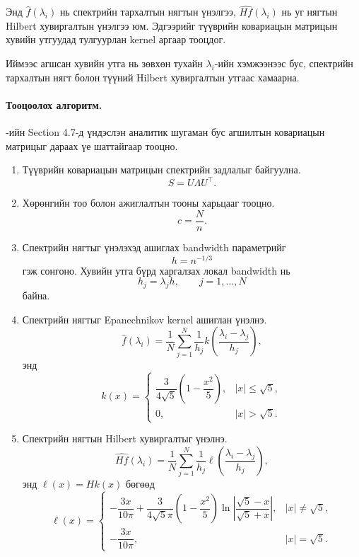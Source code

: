 Энд $\widehat{f}(\lambda_i)$ нь
спектрийн тархалтын нягтын үнэлгээ,
$\widehat{Hf}(\lambda_i)$ нь уг нягтын
Hilbert хувиргалтын үнэлгээ юм.
Эдгээрийг түүврийн ковариацын матрицын
хувийн утгуудад тулгуурлан kernel
аргаар тооцдог.

Иймээс агшсан хувийн утга нь зөвхөн
тухайн $\lambda_i$-ийн хэмжээнээс бус,
спектрийн тархалтын нягт болон түүний
Hilbert хувиргалтын утгаас хамаарна.

\paragraph{Тооцоолох алгоритм.}

\citet{ledoitwolf2020}-ийн Section 4.7-д
үндэслэн аналитик шугаман бус агшилтын
ковариацын матрицыг дараах үе шаттайгаар
тооцно.

\begin{enumerate}
	

	\item Түүврийн ковариацын матрицын
	спектрийн задлалыг байгуулна.
	\[
	S=U\Lambda U^{\top}.
	\]
	
	\item Хөрөнгийн тоо болон ажиглалтын
	тооны харьцааг тооцно.
	\[
	c=\frac{N}{n}.
	\]
	
	\item Спектрийн нягтыг үнэлэхэд
	ашиглах bandwidth параметрийг
	\[
	h=n^{-1/3}
	\]
	гэж сонгоно. Хувийн утга бүрд
	харгалзах локал bandwidth нь
	\[
	h_j=\lambda_jh,
	\qquad j=1,\ldots,N
	\]
	байна.
	
	\item Спектрийн нягтыг Epanechnikov
	kernel ашиглан үнэлнэ.
	\[
	\widehat{f}(\lambda_i)
	=
	\frac{1}{N}
	\sum_{j=1}^{N}
	\frac{1}{h_j}
	k\left(
	\frac{\lambda_i-\lambda_j}{h_j}
	\right),
	\]
	энд
	\[
	k(x)
	=
	\begin{cases}
		\dfrac{3}{4\sqrt{5}}
		\left(1-\dfrac{x^2}{5}\right),
		& |x|\leq\sqrt{5},\\[0.5em]
		0,
		& |x|>\sqrt{5}.
	\end{cases}
	\]
	
	\item Спектрийн нягтын Hilbert
	хувиргалтыг үнэлнэ.
	\[
	\widehat{Hf}(\lambda_i)
	=
	\frac{1}{N}
	\sum_{j=1}^{N}
	\frac{1}{h_j}
	\ell\left(
	\frac{\lambda_i-\lambda_j}{h_j}
	\right),
	\]
	энд $\ell(x)=Hk(x)$ бөгөөд
	\[
	\ell(x)
	=
	\begin{cases}
		-\dfrac{3x}{10\pi}
		+
		\dfrac{3}{4\sqrt{5}\pi}
		\left(1-\dfrac{x^2}{5}\right)
		\ln\left|
		\dfrac{\sqrt{5}-x}{\sqrt{5}+x}
		\right|,
		& |x|\neq\sqrt{5},\\[1em]
		-\dfrac{3x}{10\pi},
		& |x|=\sqrt{5}.
	\end{cases}
	\]
	

\end{enumerate}
